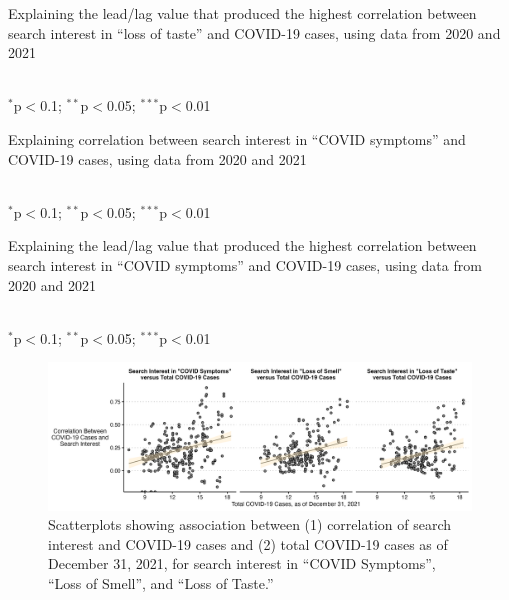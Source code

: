 \documentclass{article}
\begin{document}
\setlength{\tabcolsep}{4pt}
\begin{table}[H]
\centering
\caption{Explaining the lead/lag value that produced the highest correlation between search interest in ``loss of taste'' and COVID-19 cases, using data from 2020 and 2021}
 \\
\flushleft $^{*}$p$<$0.1; $^{**}$p$<$0.05; $^{***}$p$<$0.01
\label{tab:lag_reg_table_loss_of_taste}
\end{table}

\setlength{\tabcolsep}{4pt}
\begin{table}[H]
\centering
\caption{Explaining correlation between search interest in ``COVID symptoms'' and COVID-19 cases, using data from 2020 and 2021}
 \\
\flushleft $^{*}$p$<$0.1; $^{**}$p$<$0.05; $^{***}$p$<$0.01
\label{tab:cor_reg_table_covidsymptoms}
\end{table}

\setlength{\tabcolsep}{4pt}
\begin{table}[H]
\centering
\caption{Explaining the lead/lag value that produced the highest correlation between search interest in ``COVID symptoms'' and COVID-19 cases, using data from 2020 and 2021}
 \\
\flushleft $^{*}$p$<$0.1; $^{**}$p$<$0.05; $^{***}$p$<$0.01\label{tab:lm_lag_daily_covid_symptoms}
\end{table}

\begin{figure}[H]
    \includegraphics[width=1\textwidth]{figures/cor_casestotal_scatter.png}
    \caption{Scatterplots showing association between (1) correlation of search interest and COVID-19 cases and (2) total COVID-19 cases as of December 31, 2021, for search interest in ``COVID Symptoms'', ``Loss of Smell'', and ``Loss of Taste.''}
    \label{fig:cor_casestotal_scatter}
\end{figure}
\end{document}

